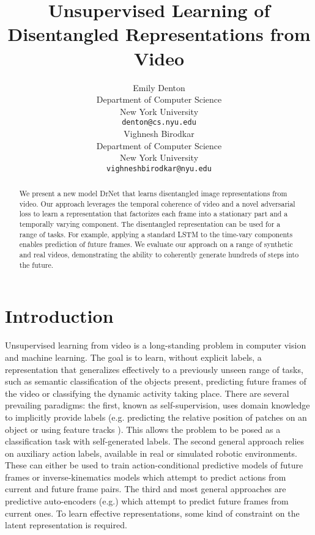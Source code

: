 \documentclass{article}
\title{Unsupervised Learning of Disentangled Representations from Video}
\author{
  Emily Denton \\
  Department of Computer Science\\
 New York University\\
  \texttt{denton@cs.nyu.edu} \\
  \And
     Vighnesh Birodkar\\
  Department of Computer Science\\
 New York University\\
  \texttt{vighneshbirodkar@nyu.edu} \\
}
\newcommand{\drnet}{{\sc DrNet} }
\begin{document}

\maketitle
\vspace{-3mm}
\begin{abstract}
  We present a new model \drnet that learns disentangled image
  representations from video. Our approach leverages the temporal
  coherence of video and a novel adversarial loss to learn a
  representation that factorizes each frame into a stationary part and
  a temporally varying component. The disentangled representation can
  be used for a range of tasks. For example, applying a standard LSTM
  to the time-vary components enables prediction of future frames. We
  evaluate our approach on a range of synthetic and real videos,  demonstrating the ability to coherently generate hundreds of steps into the future. 
\end{abstract}
\vspace{-1mm}
\vspace{-3mm}\section{Introduction}\vspace{-2mm}
Unsupervised learning from video is a long-standing problem in computer vision and machine learning. The goal is to learn, without explicit labels, a representation that generalizes effectively to a previously unseen range of tasks, such as semantic classification of the objects present, predicting future frames of the video or classifying the dynamic activity taking place. There are several prevailing paradigms: the first, known as self-supervision, uses domain knowledge to implicitly provide labels (e.g. predicting the relative position of patches on an object \cite{doersch2015unsupervised} or using feature tracks \cite{wang2015unsupervised}). This allows the problem to be posed as a classification task with self-generated labels. The second general approach relies on auxiliary action labels, available in real or simulated robotic environments. These can either be used to train action-conditional predictive models of future frames \cite{Chiappa17,oh15} or inverse-kinematics models \cite{agrawal2016learning} which attempt to predict actions from current and future frame pairs. The third and most general approaches are predictive auto-encoders (e.g.\cite{hinton2006reducing,Kalchbrenner16,Mathieu15,Srivastava15}) which attempt to predict future frames from current ones. To learn effective representations, some kind of constraint on the latent representation is required.   
\end{document}
